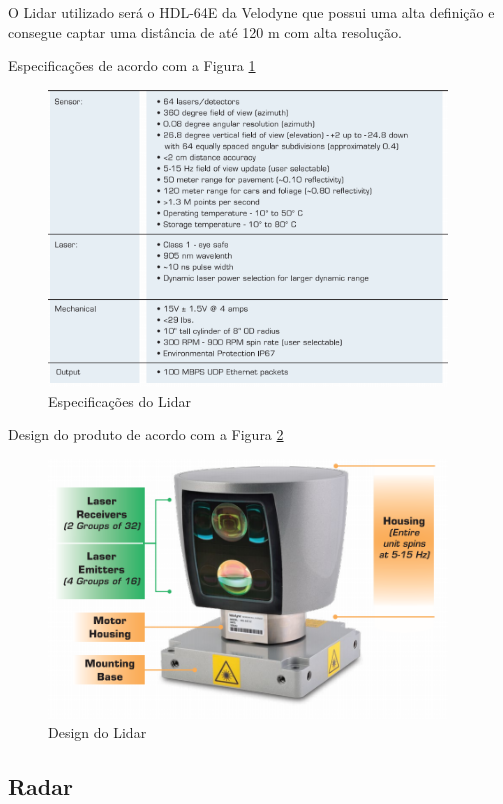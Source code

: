 O Lidar utilizado será o HDL-64E da Velodyne que possui uma alta definição e
consegue captar uma distância de até 120 m com alta resolução.

Especificações de acordo com a Figura \ref{fig:especificacoes_lidar}

\begin{figure}[h]
  \centering
  \includegraphics[width=400px, scale=1]{figuras/especificacoes_lidar}
  \caption{Especificações do Lidar}
\label{fig:especificacoes_lidar}
\end{figure}

Design do produto de acordo com a Figura \ref{fig:design_lidar}

\begin{figure}[h]
  \centering
  \includegraphics[width=400px, scale=1]{figuras/design_lidar}
  \caption{Design do Lidar}
\label{fig:design_lidar}
\end{figure}


\subsection{Radar}

